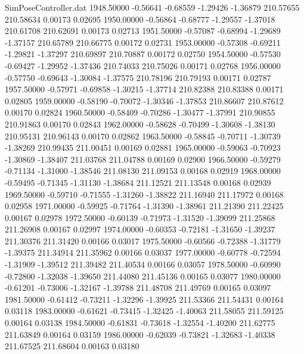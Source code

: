\begin{filecontents}{SimPoseController.dat}
1948.50000   -0.56641   -0.68559    -1.29426   -1.36879  210.57655  210.58634    0.00173    0.02695
1950.00000   -0.56864   -0.68777    -1.29557   -1.37018  210.61708  210.62691    0.00173    0.02713
1951.50000   -0.57087   -0.68994    -1.29689   -1.37157  210.65789  210.66775    0.00172    0.02731
1953.00000   -0.57308   -0.69211    -1.29821   -1.37297  210.69897  210.70887    0.00172    0.02750
1954.50000   -0.57530   -0.69427    -1.29952   -1.37436  210.74033  210.75026    0.00171    0.02768
1956.00000   -0.57750   -0.69643    -1.30084   -1.37575  210.78196  210.79193    0.00171    0.02787
1957.50000   -0.57971   -0.69858    -1.30215   -1.37714  210.82388  210.83388    0.00171    0.02805
1959.00000   -0.58190   -0.70072    -1.30346   -1.37853  210.86607  210.87612    0.00170    0.02824
1960.50000   -0.58409   -0.70286    -1.30477   -1.37991  210.90855  210.91863    0.00170    0.02843
1962.00000   -0.58628   -0.70499    -1.30608   -1.38130  210.95131  210.96143    0.00170    0.02862
1963.50000   -0.58845   -0.70711    -1.30739   -1.38269  210.99435  211.00451    0.00169    0.02881
1965.00000   -0.59063   -0.70923    -1.30869   -1.38407  211.03768  211.04788    0.00169    0.02900
1966.50000   -0.59279   -0.71134    -1.31000   -1.38546  211.08130  211.09153    0.00168    0.02919
1968.00000   -0.59495   -0.71345    -1.31130   -1.38684  211.12521  211.13548    0.00168    0.02939
1969.50000   -0.59710   -0.71555    -1.31260   -1.38822  211.16940  211.17972    0.00168    0.02958
1971.00000   -0.59925   -0.71764    -1.31390   -1.38961  211.21390  211.22425    0.00167    0.02978
1972.50000   -0.60139   -0.71973    -1.31520   -1.39099  211.25868  211.26908    0.00167    0.02997
1974.00000   -0.60353   -0.72181    -1.31650   -1.39237  211.30376  211.31420    0.00166    0.03017
1975.50000   -0.60566   -0.72388    -1.31779   -1.39375  211.34914  211.35962    0.00166    0.03037
1977.00000   -0.60778   -0.72594    -1.31909   -1.39512  211.39482  211.40534    0.00166    0.03057
1978.50000   -0.60990   -0.72800    -1.32038   -1.39650  211.44080  211.45136    0.00165    0.03077
1980.00000   -0.61201   -0.73006    -1.32167   -1.39788  211.48708  211.49769    0.00165    0.03097
1981.50000   -0.61412   -0.73211    -1.32296   -1.39925  211.53366  211.54431    0.00164    0.03118
1983.00000   -0.61621   -0.73415    -1.32425   -1.40063  211.58055  211.59125    0.00164    0.03138
1984.50000   -0.61831   -0.73618    -1.32554   -1.40200  211.62775  211.63849    0.00164    0.03159
1986.00000   -0.62039   -0.73821    -1.32683   -1.40338  211.67525  211.68604    0.00163    0.03180

\end{filecontents}
